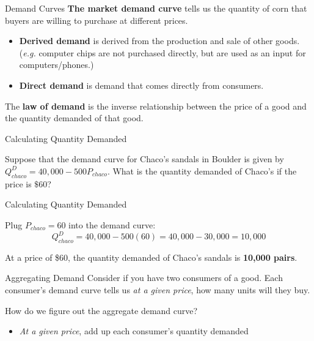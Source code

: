 \documentclass[12pt,t]{beamer}
\begin{document}
\begin{frame}{Demand Curves}
  \textbf{The market demand curve} tells us the quantity of corn that buyers are willing to purchase at different prices.
  \begin{itemize}
    \item \textbf{Derived demand} is derived from the production and sale of other goods. (\emph{e.g.} computer chips are not purchased directly, but are used as an input for computers/phones.)
    \item \textbf{Direct demand} is demand that comes directly from consumers.
  \end{itemize}

  \bigskip
  The \textbf{law of demand} is the inverse relationship between the price of a good and the quantity demanded of that good.
\end{frame}

\begin{frame}{Calculating Quantity Demanded}

\bigskip
Suppose that the demand curve for Chaco's sandals in Boulder is given by $Q^D_{chaco} = 40,000  - 500P_{chaco}$. What is the quantity demanded of Chaco's if the price is $ \$ 60 $?

\end{frame}

\begin{frame}{Calculating Quantity Demanded}

\bigskip
Plug $P_{chaco} = 60$ into the demand curve:
$$
  Q^D_{chaco} = 40,000 - 500(60) = 40,000 - 30,000 = 10,000
$$

\bigskip
At a price of \$60, the quantity demanded of Chaco's sandals is \textbf{10,000 pairs}.
\end{frame}

\begin{frame}{Aggregating Demand}
  Consider if you have two consumers of a good. Each consumer's demand curve tells us \emph{at a given price}, how many units will they buy.

  \bigskip
  How do we figure out the aggregate demand curve? 
  
  \begin{itemize}
    \item \emph{At a given price}, add up each consumer's quantity demanded
  \end{itemize}
\end{frame}
\end{document}
